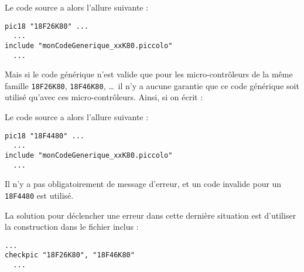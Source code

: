 Le code source a alors l'allure suivante :
\begin{lstlisting}[language=piccolo]
pic18 "18F26K80" ...
  ...
include "monCodeGenerique_xxK80.piccolo"
  ...
\end{lstlisting}

Mais si le code générique n'est valide que pour les micro-contrôleurs de la même famille \texttt{18F26K80}, \texttt{18F46K80}, \dots\ il n'y a aucune garantie que ce code générique soit utilisé qu'avec ces micro-contrôleurs. Ainsi, si on écrit :

Le code source a alors l'allure suivante :
\begin{lstlisting}[language=piccolo]
pic18 "18F4480" ...
  ...
include "monCodeGenerique_xxK80.piccolo"
  ...
\end{lstlisting}

Il n'y a pas obligatoirement de message d'erreur, et un code invalide pour un \texttt{18F4480} est utilisé.


La solution pour déclencher une erreur dans cette dernière situation est d'utiliser la construction  dans le fichier inclus  :

\begin{lstlisting}[language=piccolo]
  ...
checkpic "18F26K80", "18F46K80"
  ...
\end{lstlisting}


 